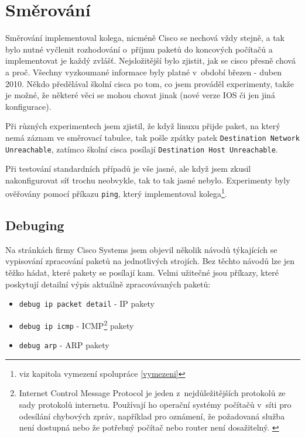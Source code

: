 \section{Směrování} \label{prijmiEthernetove}
Směrování implementoval kolega, nicméně Cisco se nechová vždy stejně, a tak bylo nutné vyčlenit rozhodování o~příjmu paketů do koncových počítačů a implementovat je každý zvlášť. Nejsložitější bylo zjistit, jak se cisco přesně chová a proč. Všechny vyzkoumané informace byly platné v~období březen - duben 2010. Někdo předělával školní cisca po tom, co jsem prováděl experimenty, takže je možné, že některé věci se mohou chovat jinak (nové verze IOS či jen jiná konfigurace). 

Při různých experimentech jsem zjistil, že když linuxu přijde paket, na který nemá záznam ve směrovací tabulce, tak pošle zpátky patek \verb|Destination Network Unreachable|, zatímco školní cisca posílají \verb|Destination Host Unreachable|.

Při testování standardních případů je vše jasné, ale když jsem zkusil nakonfigurovat síť trochu neobvykle, tak to tak jasné nebylo. Experimenty byly ověřovány pomocí příkazu \verb|ping|, který implementoval kolega\footnote{viz kapitola vymezení spolupráce \ref{vymezeni}}. 


\subsection{Debuging}
Na stránkách firmy Cisco Systems jsem objevil několik návodů týkajících se vypisování zpracování paketů na jednotlivých strojích. Bez těchto návodů lze jen těžko hádat, které pakety se posílají kam. Velmi užitečné jsou příkazy, které poskytují detailní výpis aktuálně zpracovávaných paketů:

\begin{itemize}
 \item \verb|debug ip packet detail| - IP pakety 
 \item \verb|debug ip icmp| - ICMP\footnote{Internet Control Message Protocol je jeden z~nejdůležitějších protokolů ze sady protokolů internetu. Používají ho operační systémy počítačů v~síti pro odesílání chybových zpráv, například pro oznámení, že požadovaná služba není dostupná nebo že potřebný počítač nebo router není dosažitelný. \cite{wiki:icmp}} pakety
 \item \verb|debug arp| - ARP pakety
\end{itemize}

